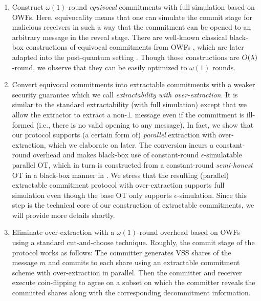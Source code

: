 \begin{enumerate}
\item Construct $\omega(1)$-round \emph{equivocal} commitments with full simulation based on OWFs. Here, equivocality means that one can simulate the commit stage for malicious receivers in such a way that the commitment can be opened to an arbitrary message in the reveal stage. There are well-known classical black-box constructions of equivocal commitments from OWFs \cite{STOC:Kilian88,FOCS:Kilian94,TCC:PasWee09}, which are later adapted into the post-quantum setting \cite{C:BCKM21b}. Though those constructions are $O(\lambda)$-round, we observe that they can be easily optimized to $\omega(1)$ rounds.
\item 
Convert equivocal commitments into extractable commitments with a weaker security guarantee which we call \emph{extractability with over-extraction}. It is similar to the standard extractability (with full simulation) except that we allow the extractor to extract a non-$\bot$ message even if the commitment is ill-formed (i.e., there is no valid opening to any message).  In fact, we show that our protocol supports (a certain form of) \emph{parallel} extraction with over-extraction, which we elaborate on later. 
The conversion incurs a constant-round overhead and makes black-box use of constant-round $\epsilon$-simulatable parallel OT, which in turn is constructed from a constant-round \emph{semi-honest} OT in a black-box manner in \cite{C:CCLY22}. We stress that the resulting (parallel) extractable commitment protocol with over-extraction supports full simulation even though the base OT only supports $\epsilon$-simulation. Since this step is the technical core of our construction of extractable commitments, we will provide more details shortly.  
\item Eliminate over-extraction with a $\omega(1)$-round overhead based on OWFs using a standard cut-and-choose technique. Roughly, the commit stage of the protocol works as follows: The committer generates VSS shares of the message $m$ and commits to each share using an extractable commitment scheme with over-extraction in parallel. Then the committer and receiver  execute coin-flipping to agree on a subset on which the committer reveals the committed shares along with the corresponding decommitment information. 

\end{enumerate}
